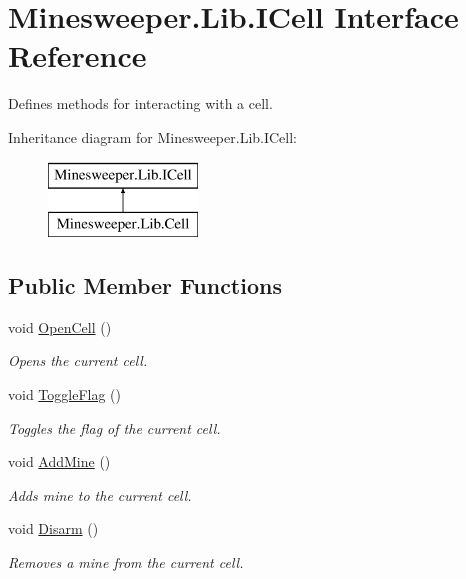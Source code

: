 \hypertarget{interface_minesweeper_1_1_lib_1_1_i_cell}{\section{Minesweeper.\+Lib.\+I\+Cell Interface Reference}
\label{interface_minesweeper_1_1_lib_1_1_i_cell}
}


Defines methods for interacting with a cell.  


Inheritance diagram for Minesweeper.\+Lib.\+I\+Cell\+:\begin{figure}[H]
\begin{center}
\leavevmode
\includegraphics[height=2.000000cm]{interface_minesweeper_1_1_lib_1_1_i_cell}
\end{center}
\end{figure}
\subsection*{Public Member Functions}
\begin{DoxyCompactItemize}
\item 
void \hyperlink{interface_minesweeper_1_1_lib_1_1_i_cell_aa7b5d6db30495f23c0aa595e95aa16ae}{Open\+Cell} ()
\begin{DoxyCompactList}\small\item\em Opens the current cell. \end{DoxyCompactList}\item 
void \hyperlink{interface_minesweeper_1_1_lib_1_1_i_cell_acb11d64a47cb3176d2fe42a093958e49}{Toggle\+Flag} ()
\begin{DoxyCompactList}\small\item\em Toggles the flag of the current cell. \end{DoxyCompactList}\item 
void \hyperlink{interface_minesweeper_1_1_lib_1_1_i_cell_a0befb554376beed982e468052e7c0ed6}{Add\+Mine} ()
\begin{DoxyCompactList}\small\item\em Adds mine to the current cell. \end{DoxyCompactList}\item 
void \hyperlink{interface_minesweeper_1_1_lib_1_1_i_cell_a12556fc759e102491c7ce2c432bd0dec}{Disarm} ()
\begin{DoxyCompactList}\small\item\em Removes a mine from the current cell. \end{DoxyCompactList}\end{DoxyCompactItemize}
